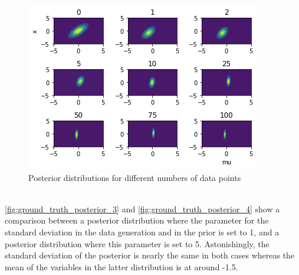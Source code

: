 \documentclass{article}
\begin{document}
\begin{figure}
	\includegraphics[width=\textwidth]{images/posterior_different_data_sizes.png}
	\caption[Posterior distributions for different numbers of data points]{Posterior distributions for different numbers of data points}
	\label{fig:posterior_different_data_sizes}
\end{figure}
\\
\autoref{fig:ground_truth_posterior_3} and \autoref{fig:ground_truth_posterior_4} show a comparison between a posterior distribution where the parameter for the standard deviation in the data generation and in the prior is set to 1, and a posterior distribution where this parameter is set to 5. Astonishingly, the standard deviation of the posterior is nearly the same in both cases whereas the mean of the variables in the latter distribution is at around -1.5. 
\end{document}
